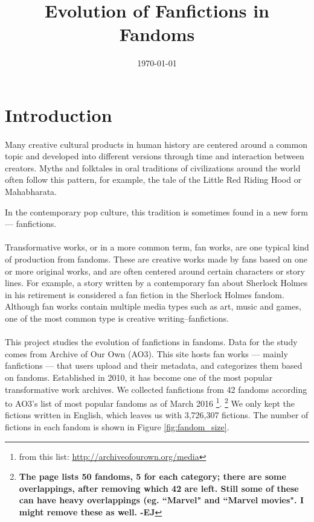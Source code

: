 \documentclass[11pt]{article} %
\def\ej#1{\footnote{\color{blue}\textbf{#1 -EJ}} }
\begin{document}

\title{Evolution of Fanfictions in Fandoms} %
\date{\today}
\maketitle %

\section{Introduction} %
\label{sec:introduction}
\paragraph{} Many creative cultural products in human history are centered around a common topic and developed into different versions through time and interaction between creators. Myths and folktales in oral traditions of civilizations around the world often follow this pattern, for example, the tale of the Little Red Riding Hood or Mahabharata. 

In the contemporary pop culture, this tradition is sometimes found in a new form --- fanfictions. 

\paragraph{}Transformative works, or in a more common term, fan works, are one typical kind of production from fandoms\cite{wiki:transf_work}. These are creative works made by fans based on one or more original works, and are often centered around certain characters or story lines. For example, a story written by a contemporary fan about Sherlock Holmes in his retirement is considered a fan fiction in the Sherlock Holmes fandom. Although fan works contain multiple media types such as art, music and games, one of the most common type is creative writing--fanfictions.

\paragraph{} This project studies the evolution of fanfictions in fandoms. Data for the study comes from Archive of Our Own (AO3). This site hosts fan works --- mainly fanfictions --- that users upload and their metadata, and categorizes them based on fandoms. Established in 2010, it has become one of the most popular transformative work archives. We collected fanfictions from 42 fandoms according to AO3's list of most popular fandoms as of March 2016 \footnote{from this list: \url{http://archiveofourown.org/media}}. \ej{The page lists 50 fandoms, 5 for each category; there are some overlappings, after removing which 42 are left. Still some of these can have heavy overlappings (eg. ``Marvel" and ``Marvel movies". I might remove these as well.}
We only kept the fictions written in English, which leaves us with 3,726,307 fictions. The number of fictions in each fandom is shown in Figure \ref{fig:fandom_size}.
\end{document}
